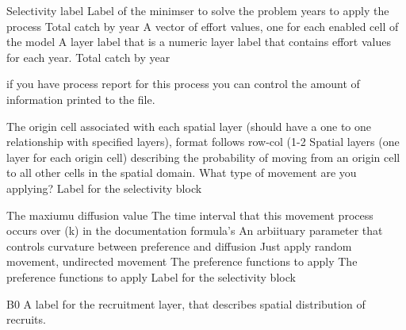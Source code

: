  {}
\par\textbf{}\par
{} {Selectivity label}
 {Label of the minimser to solve the problem}
 {years to apply the process}
 {Total catch by year}
 {A vector of effort values, one for each enabled cell of the model}
 {A layer label that is a numeric layer label that contains effort values for each year.}
 {Total catch by year}
\par\textbf{}\par
{} {if you have process report for this process you can control the amount of information printed to the file.}
\par\textbf{}\par
{} {The origin cell associated with each spatial layer (should have a one to one relationship with specified layers), format follows row-col (1-2}
 {Spatial layers (one layer for each origin cell) describing the probability of moving from an origin cell to all other cells in the spatial domain.}
 {What type of movement are you applying?}
 {Label for the selectivity block}
\par\textbf{}\par
{} {The maxiumu diffusion value}
 {The time interval that this movement process occurs over (k) in the documentation formula's}
 {An arbiituary parameter that controls curvature between preference and diffusion}
 {Just apply random movement, undirected movement}
 {The preference functions to apply}
 {The preference functions to apply}
 {Label for the selectivity block}
\par\textbf{}\par
\par\textbf{}\par
{} {B0}
 {A label for the recruitment layer, that describes spatial distribution of recruits.}
